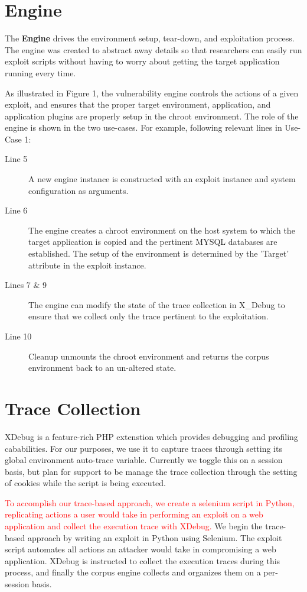 \documentclass[letterpaper,twocolumn,10pt]{article}
\begin{document}
\section{Engine}
The {\bf Engine} drives the environment setup, tear-down, and exploitation process. The engine was created to abstract away details so that researchers can easily run exploit scripts without having to worry about getting the target application running every time. \par
As illustrated in Figure 1, the vulnerability engine controls the actions of a given exploit, and ensures that the proper target environment, application, and application plugins are properly setup in the chroot environment. The role of the engine is shown in the two use-cases. For example, following relevant lines in Use-Case 1:
\begin{description}
  \item[Line 5] A new engine instance is constructed with an exploit instance and system configuration as arguments.
  \item[Line 6] The engine creates a chroot environment on the host system to which the target application is copied and the pertinent MYSQL databases are established. The setup of the environment is determined by the 'Target' attribute in the exploit instance. 
  \item[Lines 7 \& 9] The engine can modify the state of the trace collection in X\_Debug to ensure that we collect only the trace pertinent to the exploitation.
  \item[Line 10] Cleanup unmounts the chroot environment and returns the corpus environment back to an un-altered state.
\end{description}

\section{Trace Collection}


XDebug is a feature-rich PHP extenstion which provides debugging and profiling cababilities.  For our purposes, we use it to capture traces through setting its global environment auto-trace variable.  Currently we toggle this on a session basis, but plan for support to be manage the trace collection through the setting of cookies while the script is being executed.\par


\textcolor{red}{To accomplish our trace-based approach, we create a selenium script in Python, replicating actions a user would take in performing an exploit on a web application and collect the execution trace with XDebug.}
We begin the trace-based approach by writing an exploit in Python using Selenium. The exploit script automates all actions an attacker would take in compromising a web application. XDebug is instructed to collect the execution traces during this process, and finally the corpus engine collects and organizes them on a per-session basis.
\end{document}
